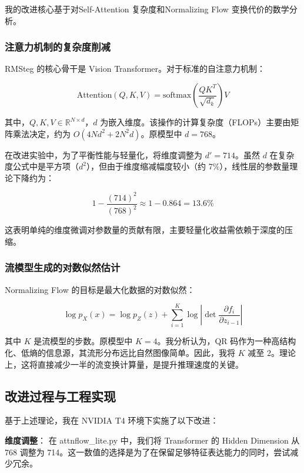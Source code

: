 \documentclass[12pt]{ctexart}
\begin{document}
我的改进核心基于对Self-Attention 复杂度和Normalizing Flow 变换代价的数学分析。

\subsubsection{注意力机制的复杂度削减}

RMSteg 的核心骨干是 Vision Transformer。对于标准的自注意力机制：

\begin{equation}
    \text{Attention}(Q,K,V) = \text{softmax}\left(\frac{QK^T}{\sqrt{d_k}}\right)V
\end{equation}

其中，$Q,K,V \in \mathbb{R}^{N \times d}$，$d$ 为嵌入维度。该操作的计算复杂度（FLOPs）主要由矩阵乘法决定，约为 $O(4Nd^2 + 2N^2d)$。原模型中 $d=768$。

在改进实验中，为了平衡性能与轻量化，将维度调整为 $d' = 714$。虽然 $d$ 在复杂度公式中是平方项（$d^2$），但由于维度缩减幅度较小（约 7\%），线性层的参数量理论下降约为：

\begin{equation}
    1 - \frac{(714)^2}{(768)^2} \approx 1 - 0.864 = 13.6\%
\end{equation}

这表明单纯的维度微调对参数量的贡献有限，主要轻量化收益需依赖于深度的压缩。

\subsubsection{流模型生成的对数似然估计}

Normalizing Flow 的目标是最大化数据的对数似然：

\begin{equation}
    \log p_X(x) = \log p_Z(z) + \sum_{i=1}^K \log \left| \det \frac{\partial f_i}{\partial z_{i-1}} \right|
\end{equation}

其中 $K$ 是流模型的步数。原模型中 $K=4$。我分析认为，QR 码作为一种高结构化、低熵的信息源，其流形分布远比自然图像简单。因此，我将 $K$ 减至 2。理论上，这将直接减少一半的流变换计算量，是提升推理速度的关键。

\subsection{改进过程与工程实现}

基于上述理论，我在 NVIDIA T4 环境下实施了以下改进：

\textbf{维度调整}：
    在 attnflow\_lite.py 中，我们将 Transformer 的 Hidden Dimension 从 768 调整为 714。这一数值的选择是为了在保留足够特征表达能力的同时，尝试减少冗余。
\end{document}
